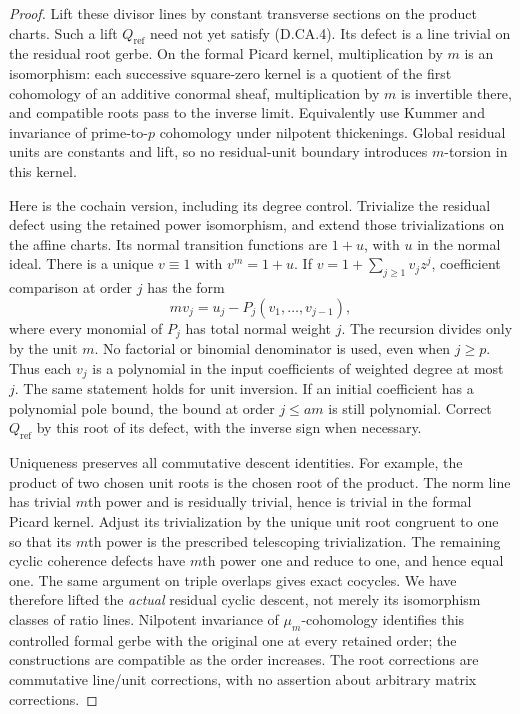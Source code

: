 \begin{proof}
Lift these divisor lines by constant transverse sections
on the product charts. Such a lift $Q_{\mathrm{ref}}$ need
not yet satisfy (D.CA.4). Its defect is a line trivial on
the residual root gerbe. On the formal Picard kernel,
multiplication by $m$ is an isomorphism: each successive
square-zero kernel is a quotient of the first cohomology
of an additive conormal sheaf, multiplication by $m$ is
invertible there, and compatible roots pass to the inverse
limit. Equivalently use Kummer and invariance of prime-to-$p$
cohomology under nilpotent thickenings. Global residual
units are constants and lift, so no residual-unit boundary
introduces $m$-torsion in this kernel.

Here is the cochain version, including its degree control.
Trivialize the residual defect using the retained power
isomorphism, and extend those trivializations on the affine
charts. Its normal transition functions are $1+u$, with
$u$ in the normal ideal. There is a unique $v\equiv1$
with $v^m=1+u$. If
$v=1+\sum_{j\geq1}v_jz^j$, coefficient comparison at
order $j$ has the form
\[
       m v_j=u_j-P_j(v_1,\ldots,v_{j-1}),               \tag{D.CA.6}
\]
where every monomial of $P_j$ has total normal weight $j$.
The recursion divides only by the unit $m$. No factorial
or binomial denominator is used, even when $j\geq p$.
Thus each $v_j$ is a polynomial in the input coefficients
of weighted degree at most $j$. The same statement holds
for unit inversion. If an initial coefficient has a
polynomial pole bound, the bound at order $j\leq am$ is
still polynomial. Correct $Q_{\mathrm{ref}}$ by this root
of its defect, with the inverse sign when necessary.

Uniqueness preserves all commutative descent identities.
For example, the product of two chosen unit roots is the
chosen root of the product. The norm line has trivial
$m$th power and is residually trivial, hence is trivial
in the formal Picard kernel. Adjust its trivialization
by the unique unit root congruent to one so that its
$m$th power is the prescribed telescoping trivialization.
The remaining cyclic coherence defects have $m$th power
one and reduce to one, and hence equal one. The same
argument on triple overlaps gives exact cocycles.
We have therefore lifted the \emph{actual} residual
cyclic descent, not merely its isomorphism classes of
ratio lines. Nilpotent invariance of $\mu_m$-cohomology
identifies this controlled formal gerbe with the original
one at every retained order; the constructions are
compatible as the order increases. The root corrections
are commutative line/unit corrections, with no assertion
about arbitrary matrix corrections.


\end{proof}
